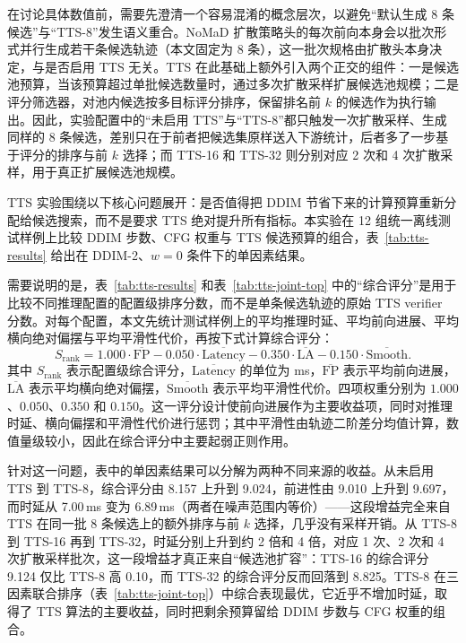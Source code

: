 在讨论具体数值前，需要先澄清一个容易混淆的概念层次，以避免``默认生成 8 条候选''与``TTS-8''发生语义重合。NoMaD 扩散策略头的每次前向本身会以批次形式并行生成若干条候选轨迹（本文固定为 8 条），这一批次规格由扩散头本身决定，与是否启用 TTS 无关。TTS 在此基础上额外引入两个正交的组件：一是候选池预算，当该预算超过单批候选数量时，通过多次扩散采样扩展候选池规模；二是评分筛选器，对池内候选按多目标评分排序，保留排名前 $k$ 的候选作为执行输出。因此，实验配置中的``未启用 TTS''与``TTS-8''都只触发一次扩散采样、生成同样的 8 条候选，差别只在于前者把候选集原样送入下游统计，后者多了一步基于评分的排序与前 $k$ 选择；而 TTS-16 和 TTS-32 则分别对应 2 次和 4 次扩散采样，用于真正扩展候选池规模。

TTS 实验围绕以下核心问题展开：是否值得把 DDIM 节省下来的计算预算重新分配给候选搜索，而不是要求 TTS 绝对提升所有指标。本实验在 12 组统一离线测试样例上比较 DDIM 步数、CFG 权重与 TTS 候选预算的组合，表~\ref{tab:tts-results} 给出在 DDIM-2、$w=0$ 条件下的单因素结果。

需要说明的是，表~\ref{tab:tts-results} 和表~\ref{tab:tts-joint-top} 中的``综合评分''是用于比较不同推理配置的配置级排序分数，而不是单条候选轨迹的原始 TTS verifier 分数。对每个配置，本文先统计测试样例上的平均推理时延、平均前向进展、平均横向绝对偏摆与平均平滑性代价，再按下式计算综合评分：
\begin{equation}
S_{\mathrm{rank}}
= 1.000 \cdot \overline{\mathrm{FP}}
- 0.050 \cdot \overline{\mathrm{Latency}}
- 0.350 \cdot \overline{\mathrm{LA}}
- 0.150 \cdot \overline{\mathrm{Smooth}}.
\end{equation}
其中 $S_{\mathrm{rank}}$ 表示配置级综合评分，$\overline{\mathrm{Latency}}$ 的单位为 ms，$\overline{\mathrm{FP}}$ 表示平均前向进展，$\overline{\mathrm{LA}}$ 表示平均横向绝对偏摆，$\overline{\mathrm{Smooth}}$ 表示平均平滑性代价。四项权重分别为 $1.000$、$0.050$、$0.350$ 和 $0.150$。这一评分设计使前向进展作为主要收益项，同时对推理时延、横向偏摆和平滑性代价进行惩罚；其中平滑性由轨迹二阶差分均值计算，数值量级较小，因此在综合评分中主要起弱正则作用。

针对这一问题，表中的单因素结果可以分解为两种不同来源的收益。从未启用 TTS 到 TTS-8，综合评分由 8.157 上升到 9.024，前进性由 9.010 上升到 9.697，而时延从 7.00\,ms 变为 6.89\,ms（两者在噪声范围内等价）——这段增益完全来自 TTS 在同一批 8 条候选上的额外排序与前 $k$ 选择，几乎没有采样开销。从 TTS-8 到 TTS-16 再到 TTS-32，时延分别上升到约 2 倍和 4 倍，对应 1 次、2 次和 4 次扩散采样批次，这一段增益才真正来自``候选池扩容''：TTS-16 的综合评分 9.124 仅比 TTS-8 高 0.10，而 TTS-32 的综合评分反而回落到 8.825。TTS-8 在三因素联合排序（表~\ref{tab:tts-joint-top}）中综合表现最优，它近乎不增加时延，取得了 TTS 算法的主要收益，同时把剩余预算留给 DDIM 步数与 CFG 权重的组合。

